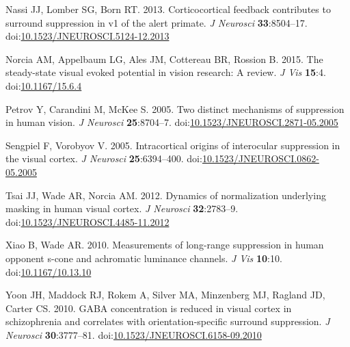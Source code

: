 \documentclass[]{article}
\begin{document}
\leavevmode\hypertarget{ref-Nassi2013}{}%
Nassi JJ, Lomber SG, Born RT. 2013. Corticocortical feedback contributes to surround suppression in v1 of the alert primate. \emph{J Neurosci} \textbf{33}:8504--17. doi:\href{https://doi.org/10.1523/JNEUROSCI.5124-12.2013}{10.1523/JNEUROSCI.5124-12.2013}

\leavevmode\hypertarget{ref-Norcia2015}{}%
Norcia AM, Appelbaum LG, Ales JM, Cottereau BR, Rossion B. 2015. The steady-state visual evoked potential in vision research: A review. \emph{J Vis} \textbf{15}:4. doi:\href{https://doi.org/10.1167/15.6.4}{10.1167/15.6.4}

\leavevmode\hypertarget{ref-Petrov2005}{}%
Petrov Y, Carandini M, McKee S. 2005. Two distinct mechanisms of suppression in human vision. \emph{J Neurosci} \textbf{25}:8704--7. doi:\href{https://doi.org/10.1523/JNEUROSCI.2871-05.2005}{10.1523/JNEUROSCI.2871-05.2005}

\leavevmode\hypertarget{ref-Sengpiel2005}{}%
Sengpiel F, Vorobyov V. 2005. Intracortical origins of interocular suppression in the visual cortex. \emph{J Neurosci} \textbf{25}:6394--400. doi:\href{https://doi.org/10.1523/JNEUROSCI.0862-05.2005}{10.1523/JNEUROSCI.0862-05.2005}

\leavevmode\hypertarget{ref-Tsai2012}{}%
Tsai JJ, Wade AR, Norcia AM. 2012. Dynamics of normalization underlying masking in human visual cortex. \emph{J Neurosci} \textbf{32}:2783--9. doi:\href{https://doi.org/10.1523/JNEUROSCI.4485-11.2012}{10.1523/JNEUROSCI.4485-11.2012}

\leavevmode\hypertarget{ref-Xiao2010}{}%
Xiao B, Wade AR. 2010. Measurements of long-range suppression in human opponent s-cone and achromatic luminance channels. \emph{J Vis} \textbf{10}:10. doi:\href{https://doi.org/10.1167/10.13.10}{10.1167/10.13.10}

\leavevmode\hypertarget{ref-Yoon2010}{}%
Yoon JH, Maddock RJ, Rokem A, Silver MA, Minzenberg MJ, Ragland JD, Carter CS. 2010. GABA concentration is reduced in visual cortex in schizophrenia and correlates with orientation-specific surround suppression. \emph{J Neurosci} \textbf{30}:3777--81. doi:\href{https://doi.org/10.1523/JNEUROSCI.6158-09.2010}{10.1523/JNEUROSCI.6158-09.2010}
\end{document}
